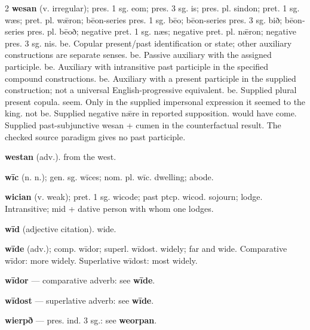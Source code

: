 \begin{multicols*}{2}
\textbf{wesan} (v. irregular); pres. 1 sg. eom; pres. 3 sg. is; pres. pl. sindon; pret. 1 sg. wæs; pret. pl. wǣron; bēon-series pres. 1 sg. bēo; bēon-series pres. 3 sg. bið; bēon-series pres. pl. bēoð; negative pret. 1 sg. næs; negative pret. pl. nǣron; negative pres. 3 sg. nis. be. Copular present/past identification or state; other auxiliary constructions are separate senses. be. Passive auxiliary with the assigned participle. be. Auxiliary with intransitive past participle in the specified compound constructions. be. Auxiliary with a present participle in the supplied construction; not a universal English-progressive equivalent. be. Supplied plural present copula. seem. Only in the supplied impersonal expression it seemed to the king. not be. Supplied negative nǣre in reported supposition. would have come. Supplied past-subjunctive wesan + cumen in the counterfactual result. The checked source paradigm gives no past participle.\par
\textbf{westan} (adv.). from the west.\par
\textbf{wīc} (n. n.); gen. sg. wīces; nom. pl. wīc. dwelling; abode.\par
\textbf{wician} (v. weak); pret. 1 sg. wicode; past ptcp. wicod. sojourn; lodge. Intransitive; mid + dative person with whom one lodges.\par
\textbf{wīd} (adjective citation). wide.\par
\textbf{wīde} (adv.); comp. wīdor; superl. wīdost. widely; far and wide. Comparative wīdor: more widely. Superlative wīdost: most widely.\par
\textbf{wīdor} — comparative adverb: see \textbf{wīde}.\par
\textbf{wīdost} — superlative adverb: see \textbf{wīde}.\par
\textbf{wierpð} — pres. ind. 3 sg.: see \textbf{weorpan}.\par

\end{multicols*}
